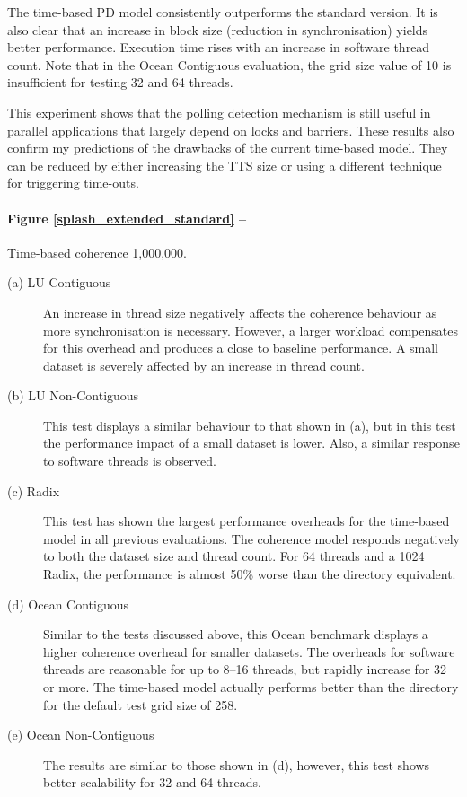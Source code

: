 		The time-based PD model consistently outperforms the standard version. It is also clear that an increase in block size (reduction in synchronisation) yields better performance. Execution time rises with an increase in software thread count. Note that in the Ocean Contiguous evaluation, the grid size value of 10 is insufficient for testing 32 and 64 threads.
		
		This experiment shows that the polling detection mechanism is still useful in parallel applications that largely depend on locks and barriers. These results also confirm my predictions of the drawbacks of the current time-based model. They can be reduced by either increasing the TTS size or using a different technique for triggering time-outs.

		\paragraph{Figure \ref{splash_extended_standard} --} Time-based coherence 1,000,000.
		\begin{description}
			\item [(a) LU Contiguous] An increase in thread size negatively affects the coherence behaviour as more synchronisation is necessary. However, a larger workload compensates for this overhead and produces a close to baseline performance. A small dataset is severely affected by an increase in thread count.
			\item [(b) LU Non-Contiguous] This test displays a similar behaviour to that shown in (a), but in this test the performance impact of a small dataset is lower. Also, a similar response to software threads is observed.
			\item [(c) Radix] This test has shown the largest performance overheads for the time-based model in all previous evaluations. The coherence model responds negatively to both the dataset size and thread count. For 64 threads and a 1024 Radix, the performance is almost 50\% worse than the directory equivalent. 
			\item [(d) Ocean Contiguous] Similar to the tests discussed above, this Ocean benchmark displays a higher coherence overhead for smaller datasets. The overheads for software threads are reasonable for up to 8--16 threads, but rapidly increase for 32 or more. The time-based model actually performs better than the directory for the default test grid size of 258. 
			\item [(e) Ocean Non-Contiguous] The results are similar to those shown in (d), however, this test shows better scalability for 32 and 64 threads.
		\end{description}
		
